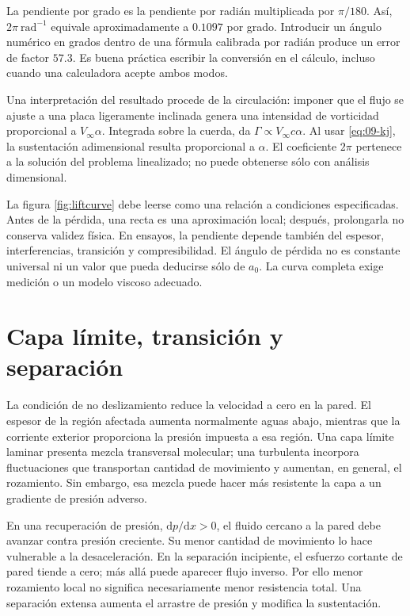La pendiente por grado es la pendiente por radián multiplicada por $\pi/180$. Así, $2\pi\ \mathrm{rad^{-1}}$ equivale aproximadamente a $0.1097$ por grado. Introducir un ángulo numérico en grados dentro de una fórmula calibrada por radián produce un error de factor $57.3$. Es buena práctica escribir la conversión en el cálculo, incluso cuando una calculadora acepte ambos modos.

Una interpretación del resultado procede de la circulación: imponer que el flujo se ajuste a una placa ligeramente inclinada genera una intensidad de vorticidad proporcional a $V_\infty\alpha$. Integrada sobre la cuerda, da $\Gamma\propto V_\infty c\alpha$. Al usar \eqref{eq:09-kj}, la sustentación adimensional resulta proporcional a $\alpha$. El coeficiente $2\pi$ pertenece a la solución del problema linealizado; no puede obtenerse sólo con análisis dimensional.

La figura \ref{fig:liftcurve} debe leerse como una relación a condiciones especificadas. Antes de la pérdida, una recta es una aproximación local; después, prolongarla no conserva validez física. En ensayos, la pendiente depende también del espesor, interferencias, transición y compresibilidad. El ángulo de pérdida no es constante universal ni un valor que pueda deducirse sólo de $a_0$. La curva completa exige medición o un modelo viscoso adecuado.

\section{Capa límite, transición y separación}
La condición de no deslizamiento reduce la velocidad a cero en la pared. El espesor de la región afectada aumenta normalmente aguas abajo, mientras que la corriente exterior proporciona la presión impuesta a esa región. Una capa límite laminar presenta mezcla transversal molecular; una turbulenta incorpora fluctuaciones que transportan cantidad de movimiento y aumentan, en general, el rozamiento. Sin embargo, esa mezcla puede hacer más resistente la capa a un gradiente de presión adverso.

En una recuperación de presión, $\mathrm dp/\mathrm dx>0$, el fluido cercano a la pared debe avanzar contra presión creciente. Su menor cantidad de movimiento lo hace vulnerable a la desaceleración. En la separación incipiente, el esfuerzo cortante de pared tiende a cero; más allá puede aparecer flujo inverso. Por ello menor rozamiento local no significa necesariamente menor resistencia total. Una separación extensa aumenta el arrastre de presión y modifica la sustentación.

